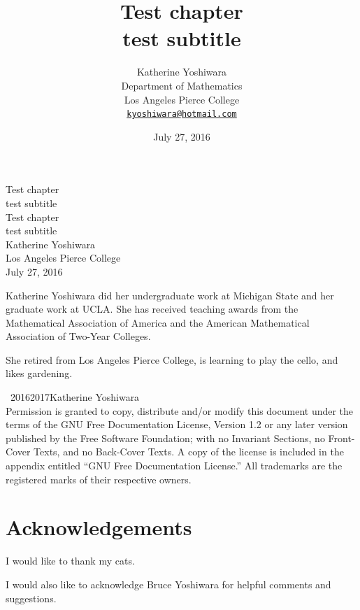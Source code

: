 \documentclass[10pt,]{book}
\title{Test chapter\\
{\large test subtitle}}
\author{Katherine Yoshiwara\\
Department of Mathematics\\
Los Angeles Pierce College\\
\href{mailto:kyoshiwara@hotmail.com}{\nolinkurl{kyoshiwara@hotmail.com}}
}
\date{July 27, 2016}
\theoremstyle{plain}
\theoremstyle{definition}
\theoremstyle{definition}
\theoremstyle{definition}
\theoremstyle{definition}
\numberwithin{equation}{section}
\begin{document}
\frontmatter
\thispagestyle{empty}
{\centering
\vspace*{0.28\textheight}
{\Huge Test chapter}\\[2\baselineskip]
{\LARGE test subtitle}\\
}
\clearpage
\thispagestyle{empty}
\null%
\clearpage
\thispagestyle{empty}
{\centering
\vspace*{0.14\textheight}
{\Huge Test chapter}\\[\baselineskip]
{\LARGE test subtitle}\\[3\baselineskip]
{\Large Katherine Yoshiwara}\\[0.5\baselineskip]
{\Large Los Angeles Pierce College}\\[3\baselineskip]
{\Large July 27, 2016}\\}
\clearpage
\thispagestyle{empty}
\noindent

            Katherine Yoshiwara did her undergraduate work at Michigan State and her graduate work at UCLA. She has received teaching awards from the Mathematical Association of America and the American Mathematical Association of Two-Year Colleges.
\par

            She retired from Los Angeles Pierce College, is learning to play the cello, and likes gardening.%
\par
{}
\noindent\textcopyright\ 2016\textendash{}2017\quad{}Katherine Yoshiwara\\[0.5\baselineskip]
Permission is granted to copy, distribute and/or modify this document under the terms of the GNU Free Documentation License, Version 1.2 or any later version published by the Free Software Foundation; with no Invariant Sections, no Front-Cover Texts, and no Back-Cover Texts.  A copy of the license is included in the appendix entitled ``GNU Free Documentation License.''  All trademarks\texttrademark{} are the registered\textregistered{} marks of their respective owners.\par
{}
\null\clearpage
\chapter*{Acknowledgements}\label{acknowledgement-1}
I would like to thank my cats.%
\par
I would also like to acknowledge Bruce Yoshiwara for  helpful comments and suggestions. %
\end{document}
